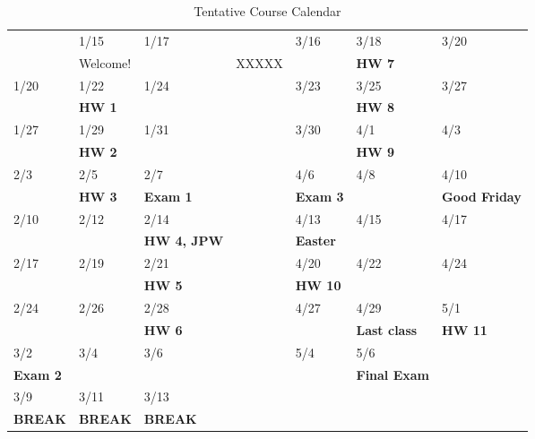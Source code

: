 \documentclass[11pt]{article}
\begin{document}
\begin{table}[htbp]
\caption{Tentative Course Calendar}
\centering
\begin{tabular}{lllllll}
\hline
 & 1/15 & 1/17 &  & 3/16 & 3/18 & 3/20\\
 & Welcome! &  & XXXXX &  & \textbf{HW 7} & \\
\hline
1/20 & 1/22 & 1/24 &  & 3/23 & 3/25 & 3/27\\
 & \textbf{HW 1} &  &  &  & \textbf{HW 8} & \\
\hline
1/27 & 1/29 & 1/31 &  & 3/30 & 4/1 & 4/3\\
 & \textbf{HW 2} &  &  &  & \textbf{HW 9} & \\
\hline
2/3 & 2/5 & 2/7 &  & 4/6 & 4/8 & 4/10\\
 & \textbf{HW 3} & \textbf{Exam 1} &  & \textbf{Exam 3} &  & \textbf{Good Friday}\\
\hline
2/10 & 2/12 & 2/14 &  & 4/13 & 4/15 & 4/17\\
 &  & \textbf{HW 4, JPW} &  & \textbf{Easter} &  & \\
\hline
2/17 & 2/19 & 2/21 &  & 4/20 & 4/22 & 4/24\\
 &  & \textbf{HW 5} &  & \textbf{HW 10} &  & \\
\hline
2/24 & 2/26 & 2/28 &  & 4/27 & 4/29 & 5/1\\
 &  & \textbf{HW 6} &  &  & \textbf{Last class} & \textbf{HW 11}\\
\hline
3/2 & 3/4 & 3/6 &  & 5/4 & 5/6 & \\
\textbf{Exam 2} &  &  &  &  & \textbf{Final Exam} & \\
\hline
3/9 & 3/11 & 3/13 &  &  &  & \\
\textbf{BREAK} & \textbf{BREAK} & \textbf{BREAK} &  &  &  & \\
\hline
\end{tabular}
\end{table}
\end{document}
